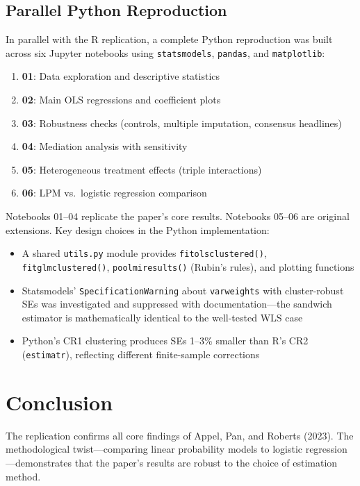 \documentclass[12pt, a4paper]{article}
\renewcommand\_{\textunderscore\hspace{0pt}}
\begin{document}
\subsection{Parallel Python Reproduction}
In parallel with the R replication, a complete Python reproduction was built across six Jupyter notebooks using \texttt{statsmodels}, \texttt{pandas}, and \texttt{matplotlib}:
\begin{enumerate}[nosep]
  \item \textbf{01}: Data exploration and descriptive statistics
  \item \textbf{02}: Main OLS regressions and coefficient plots
  \item \textbf{03}: Robustness checks (controls, multiple imputation, consensus headlines)
  \item \textbf{04}: Mediation analysis with sensitivity
  \item \textbf{05}: Heterogeneous treatment effects (triple interactions)
  \item \textbf{06}: LPM vs.\ logistic regression comparison
\end{enumerate}

Notebooks 01--04 replicate the paper's core results. Notebooks 05--06 are original extensions. Key design choices in the Python implementation:
\begin{itemize}[nosep]
  \item A shared \texttt{utils.py} module provides \texttt{fit\_ols\_clustered()}, \texttt{fit\_glm\_clustered()}, \texttt{pool\_mi\_results()} (Rubin's rules), and plotting functions
  \item Statsmodels' \texttt{SpecificationWarning} about \texttt{var\_weights} with cluster-robust SEs was investigated and suppressed with documentation---the sandwich estimator is mathematically identical to the well-tested WLS case
  \item Python's CR1 clustering produces SEs 1--3\% smaller than R's CR2 (\texttt{estimatr}), reflecting different finite-sample corrections
\end{itemize}

\section{Conclusion}

The replication confirms all core findings of Appel, Pan, and Roberts (2023). The methodological twist---comparing linear probability models to logistic regression---demonstrates that the paper's results are robust to the choice of estimation method.
\end{document}
